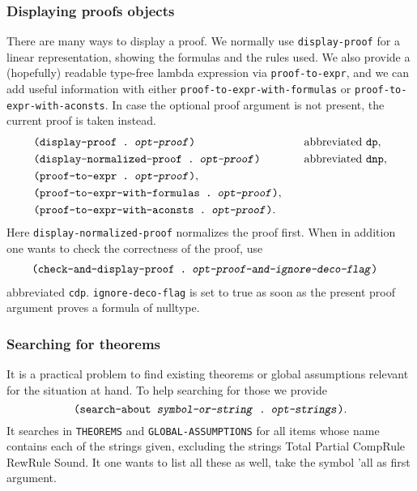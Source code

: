 \documentclass[12pt]{amsart}
\begin{document}
\begin{appendix}
\subsubsection{Displaying proofs objects}
There are many ways to display a proof.  We normally use
\texttt{display-proof} for a linear representation, showing the
formulas and the rules used.  We also provide a (hopefully) readable
type-free lambda expression via \texttt{proof-to-expr}, and we can add
useful information with either \texttt{proof-to-expr-with-formulas} or
\texttt{proof-to-expr-with-aconsts}.  In case the optional proof
argument is not present, the current proof is taken instead.
\begin{alignat*}{2}
  &\texttt{(display-proof .\ \textsl{opt-proof})}
  \index{display-proof@\texttt{display-proof}}
  &\quad& \text{abbreviated \texttt{dp}\index{dp@\texttt{dp}}},
  \\
  &\texttt{(display-normalized-proof .\ \textsl{opt-proof})}
  \index{display-normalized-proof@\texttt{display-normalized-proof}}
  &\quad& \text{abbreviated \texttt{dnp}\index{dnp@\texttt{dnp}}},
  \\
  &\texttt{(proof-to-expr .\ \textsl{opt-proof})},%
  \index{proof-to-expr@\texttt{proof-to-expr}}
  \\
  &\texttt{(proof-to-expr-with-formulas .\ \textsl{opt-proof})},%
  \index{proof-to-expr-with-formulas@\texttt{proof-to-expr-with-formulas}}
  \\
  &\texttt{(proof-to-expr-with-aconsts .\ \textsl{opt-proof})}.%
  \index{proof-to-expr-with-aconsts@\texttt{proof-to-expr-with-aconsts}}
\end{alignat*}
Here \texttt{display-normalized-proof} normalizes the proof first.
When in addition one wants to check the
correctness of the proof, use
\begin{align*}
  &\texttt{(check-and-display-proof .\
    \textsl{opt-proof-and-ignore-deco-flag})}%
  \index{check-and-display-proof@\texttt{check-and-display-proof}}
\end{align*}
abbreviated \texttt{cdp}.
\texttt{ignore-deco-flag}
is set to true as soon as the present proof argument proves a formula
of nulltype.

\subsubsection{Searching for theorems}
It is a practical problem to find existing theorems or global
assumptions relevant for the situation at hand.  To help searching
for those we provide
\begin{equation*}
  \texttt{(search-about \textsl{symbol-or-string} .\ \textsl{opt-strings})}.%
  \index{search-about@\texttt{search-about}}
\end{equation*}
It searches in \texttt{THEOREMS} and
\texttt{GLOBAL-ASSUMPTIONS}%
 for all items
whose name contains each of the strings given, excluding the strings
Total Partial CompRule RewRule Sound.  It one wants to list all these as
well, take the symbol 'all as first argument.


\end{appendix}
\end{document}
